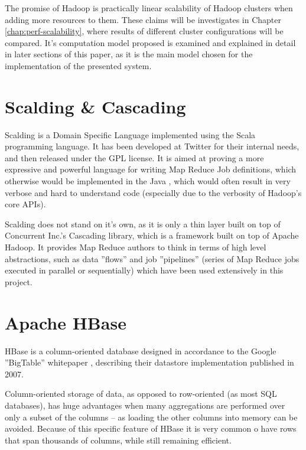 The promise of Hadoop is practically linear scalability of Hadoop clusters when adding more resources to them. These claims will be investigates in Chapter \ref{chap:perf-scalability}, where results of different cluster configurations will be compared. It's computation model proposed is examined and explained in detail in later sections of this paper, as it is the main model chosen for the implementation of the presented system.

\section{Scalding \& Cascading}
\label{sec:scalding-info}

Scalding \cite{scalding} is a Domain Specific Language implemented using the Scala \cite{scala} programming language. It has been developed at Twitter \cite{twitter} for their internal needs, and then released under the GPL license. It is aimed at proving a more expressive and powerful language for writing Map Reduce Job definitions, which otherwise
would be implemented in the Java \cite{java}, which would often result in very verbose and hard to understand code (especially due to the verbosity of Hadoop's core APIs).

Scalding does not stand on it's own, as it is only a thin layer built on top of Concurrent Inc.'s \cite{concurrent-inc} Cascading library, which is a framework built on top of Apache Hadoop. It provides Map Reduce authors to think in terms of high level abstractions, such as data ''flows'' and job ''pipelines'' (series of Map Reduce jobs executed in parallel or sequentially) which have been used extensively in this project.



\section{Apache HBase}
\label{sec:hbase}

HBase is a column-oriented database \cite{columnar-database} designed in accordance to the Google ''BigTable'' whitepaper \cite{big-table}, describing their datastore implementation published in 2007.

Column-oriented storage of data, as opposed to row-oriented (as most SQL databases), has huge advantages when many aggregations are performed over only a subset of the columns -- as loading the other columns into memory can be avoided. Because of this specific feature of HBase it is very common o have rows that span thousands of columns, while still remaining efficient.

